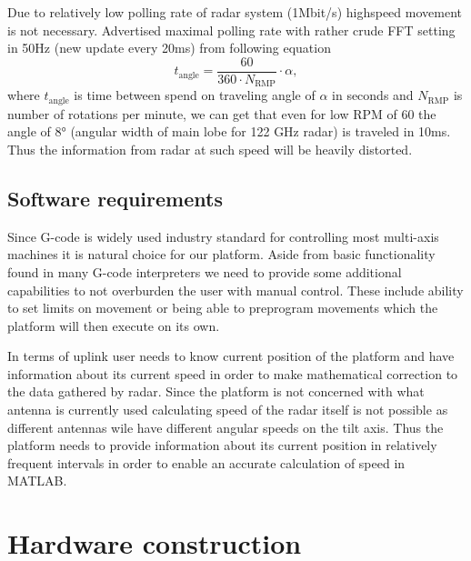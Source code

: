 Due to relatively low polling rate of radar system (1Mbit/s) highspeed movement is not necessary.
Advertised maximal polling rate with rather crude FFT setting in 50Hz (new update every 20ms) from following equation
%
\begin{equation}
	t_{\mathrm{angle}} = \frac{60}{360\cdot N_{\mathrm{RMP}}} \cdot  \alpha,
	\label{eq:poll}
\end{equation}
%
where $t_{\mathrm{angle}}$ is time between spend on traveling angle of $\alpha $ in seconds and $N_{\mathrm{RMP}}$ is number of rotations per minute, we can get that even for low RPM of 60 the angle of 8° (angular width of main lobe for 122 GHz radar) is traveled in 10ms.
Thus the information from radar at such speed will be heavily distorted.







\section{Software requirements}

Since G-code is widely used industry standard for controlling most multi-axis machines it is natural choice for our platform.
Aside from basic functionality found in many G-code interpreters we need to provide some additional capabilities to not overburden the user with manual control.
These include ability to set limits on movement or being able to preprogram movements which the platform will then execute on its own.

In terms of uplink user needs to know current position of the platform and have information about its current speed in order to make mathematical correction to the data gathered by radar.
Since the platform is not concerned with what antenna is currently used calculating speed of the radar itself is not possible as different antennas wile have different angular speeds on the tilt axis.
Thus the platform needs to provide information about its current position in relatively frequent intervals in order to enable an accurate calculation of speed in MATLAB.




\chapter{Hardware construction}


